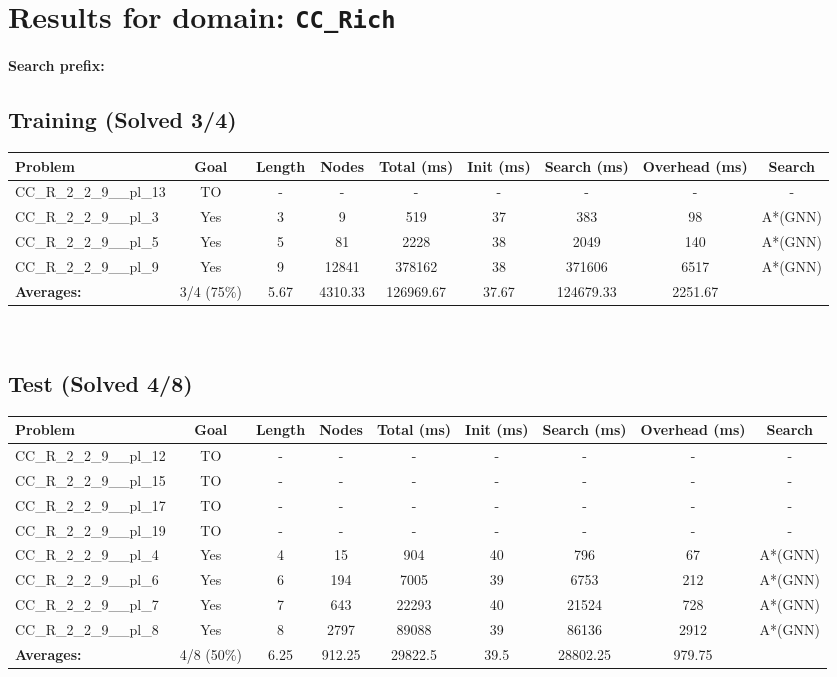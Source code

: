 \documentclass{article}
\begin{document}
\section*{Results for domain: \texttt{CC\_Rich}}
\textbf{Search prefix:} 
\\[0.5cm]
\subsection*{Training (Solved 3/4)}
\begin{tabular}{lcccccccc}
\toprule
Problem & Goal & Length & Nodes & Total (ms) & Init (ms) & Search (ms) & Overhead (ms) & Search \\
\midrule
CC\_R\_2\_2\_9\_\_pl\_13 & TO & - & - & - & - & - & - & - \\
CC\_R\_2\_2\_9\_\_pl\_3 & Yes & 3 & 9 & 519 & 37 & 383 & 98 & A*(GNN) \\
CC\_R\_2\_2\_9\_\_pl\_5 & Yes & 5 & 81 & 2228 & 38 & 2049 & 140 & A*(GNN) \\
CC\_R\_2\_2\_9\_\_pl\_9 & Yes & 9 & 12841 & 378162 & 38 & 371606 & 6517 & A*(GNN) \\
\textbf{Averages:} & 3/4 (75\%) & 5.67 & 4310.33 & 126969.67 & 37.67 & 124679.33 & 2251.67 & \\
\bottomrule
\end{tabular}
\\[0.7cm]
\subsection*{Test (Solved 4/8)}
\begin{tabular}{lcccccccc}
\toprule
Problem & Goal & Length & Nodes & Total (ms) & Init (ms) & Search (ms) & Overhead (ms) & Search \\
\midrule
CC\_R\_2\_2\_9\_\_pl\_12 & TO & - & - & - & - & - & - & - \\
CC\_R\_2\_2\_9\_\_pl\_15 & TO & - & - & - & - & - & - & - \\
CC\_R\_2\_2\_9\_\_pl\_17 & TO & - & - & - & - & - & - & - \\
CC\_R\_2\_2\_9\_\_pl\_19 & TO & - & - & - & - & - & - & - \\
CC\_R\_2\_2\_9\_\_pl\_4 & Yes & 4 & 15 & 904 & 40 & 796 & 67 & A*(GNN) \\
CC\_R\_2\_2\_9\_\_pl\_6 & Yes & 6 & 194 & 7005 & 39 & 6753 & 212 & A*(GNN) \\
CC\_R\_2\_2\_9\_\_pl\_7 & Yes & 7 & 643 & 22293 & 40 & 21524 & 728 & A*(GNN) \\
CC\_R\_2\_2\_9\_\_pl\_8 & Yes & 8 & 2797 & 89088 & 39 & 86136 & 2912 & A*(GNN) \\
\textbf{Averages:} & 4/8 (50\%) & 6.25 & 912.25 & 29822.5 & 39.5 & 28802.25 & 979.75 & \\
\bottomrule
\end{tabular}
\\[0.7cm]
\end{document}
